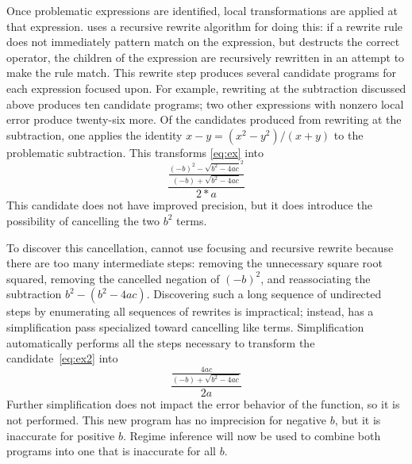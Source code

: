 \documentclass[paper.tex]{subfiles}
\begin{document}
Once problematic expressions are identified, local transformations are
applied at that expression.  \casio uses a recursive rewrite algorithm
for doing this: if a rewrite rule does not immediately pattern match
on the expression, but destructs the correct operator, the children of
the expression are recursively rewritten in an attempt to make the
rule match.  This rewrite step produces several candidate programs for
each expression focused upon.  For example, rewriting at the
subtraction discussed above produces ten candidate programs; two other
expressions with nonzero local error produce twenty-six more.  Of the
candidates produced from rewriting at the subtraction, one applies the
identity $x - y = (x^2 - y^2) / (x + y)$ to the problematic
subtraction.  This transforms \eqref{eq:ex} into
\begin{equation} \label{eq:ex2}
  \frac{\frac{(-b)^2 - \sqrt{b^2 - 4ac}^2}
             {(-b) + \sqrt{b^2 - 4ac}}}
       {2 * a}
\end{equation}
This candidate does not have improved precision, but it does introduce
the possibility of cancelling the two $b^2$ terms.

To discover this cancellation, \casio cannot use focusing and
recursive rewrite because there are too many intermediate steps:
removing the unnecessary square root squared, removing the cancelled
negation of $(-b)^2$, and reassociating the subtraction $b^2 - (b^2 - 4ac)$.
Discovering such a long sequence of undirected steps by
enumerating all sequences of rewrites is impractical; instead, \casio
has a simplification pass specialized toward cancelling like terms.
Simplification automatically performs all the steps necessary to
transform the candidate~\eqref{eq:ex2} into
\begin{equation} \label{eq:ex3}
  \frac{\frac{4ac} {(-b) + \sqrt{b^2 - 4ac}}} {2a}
\end{equation}
Further simplification does not impact the error behavior of the
function, so it is not performed.  This new program has no imprecision
for negative $b$, but it is inaccurate for positive $b$.  Regime
inference will now be used to combine both programs into one that is
inaccurate for all $b$.
\end{document}
